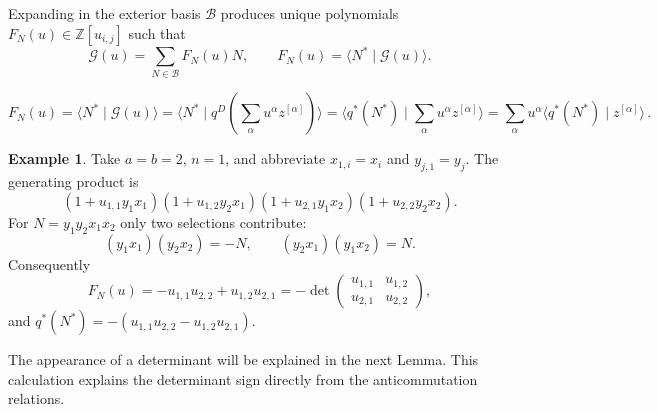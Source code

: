 \documentclass[10pt]{amsart}
\theoremstyle{definition}
\newtheorem*{example}{Example}
\theoremstyle{remark}
\begin{document}
Expanding in the exterior basis $\mathcal B$
produces unique polynomials $F_N(u)\in\mathbb Z[u_{i,j}]$ such that
\begin{equation}\label{tere}
 \mathcal G(u)=\sum_{N\in  \mathcal B} F_N(u)N,\qquad F_N(u)= \langle N^*\mid \mathcal G(u)\rangle.
\end{equation}

\begin{equation}\label{eq:FN-transpose}
F_N(u)=\langle N^*\mid \mathcal G(u)\rangle=\langle N^*\mid q^D(\sum_{\alpha}u^\alpha  
z^{[\alpha]})  \rangle=\langle q^*(N^*)\mid \sum_{\alpha}u^\alpha  
z^{[\alpha]}  \rangle= \sum_{\alpha} u^\alpha  \langle q^*(N^*)\mid   
z^{[\alpha]}  \rangle
\,.\end{equation}
 

\begin{example}\label{ex:one-index-determinant}
Take $a=b=2$, $n=1$, and abbreviate $x_{1,i }=x_i$ and $y_{ j,1}=y_j$.
The generating product is
\[
 (1+u_{1,1}y_1x_1)(1+u_{1,2}y_2x_1)
 (1+u_{2,1}y_1x_2)(1+u_{2,2}y_2x_2).
\]
For $N=y_1y_2x_1x_2$ only two selections contribute:
\[
 (y_1x_1)(y_2x_2)=-N,\qquad
 (y_2x_1)(y_1x_2)=N.
\]
Consequently
\[
 F_N(u)=-u_{1,1}u_{2,2}+u_{1,2}u_{2,1}
 =-\det\begin{pmatrix}u_{1,1}&u_{1,2}\\u_{2,1}&u_{2,2}\end{pmatrix},
\]
and $q^*(N^*)=-( u_{1,1} u_{2,2}- u_{1,2} u_{2,1})$. \smallskip

The appearance of a determinant will be explained in the next Lemma.
This calculation explains the determinant sign directly from the
anticommutation relations.
\end{example}
\end{document}
